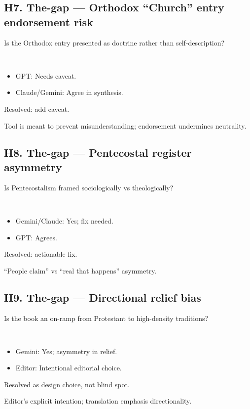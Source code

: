 \documentclass[11pt,letterpaper]{article}
\begin{document}
\subsection{H7. The-gap --- Orthodox ``Church'' entry endorsement risk}

\begin{reflist}
\item[Dispute:] Is the Orthodox entry presented as doctrine rather than self-description?
\item[Positions:]~
  \begin{itemize}[nosep]
    \item GPT: Needs caveat.
    \item Claude/Gemini: Agree in synthesis.
  \end{itemize}
\item[Status:] Resolved: add caveat.
\item[Evidence:] Tool is meant to prevent misunderstanding; endorsement undermines neutrality.
\end{reflist}

\subsection{H8. The-gap --- Pentecostal register asymmetry}

\begin{reflist}
\item[Dispute:] Is Pentecostalism framed sociologically vs theologically?
\item[Positions:]~
  \begin{itemize}[nosep]
    \item Gemini/Claude: Yes; fix needed.
    \item GPT: Agrees.
  \end{itemize}
\item[Status:] Resolved: actionable fix.
\item[Evidence:] ``People claim'' vs ``real that happens'' asymmetry.
\end{reflist}

\subsection{H9. The-gap --- Directional relief bias}

\begin{reflist}
\item[Dispute:] Is the book an on-ramp from Protestant to high-density traditions?
\item[Positions:]~
  \begin{itemize}[nosep]
    \item Gemini: Yes; asymmetry in relief.
    \item Editor: Intentional editorial choice.
  \end{itemize}
\item[Status:] Resolved as design choice, not blind spot.
\item[Evidence:] Editor's explicit intention; translation emphasis directionality.
\end{reflist}
\end{document}
